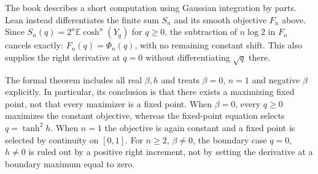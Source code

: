 \begin{remark}\label{rem:sg-tal:replica-fixed-point-comparison}
The book describes a short computation using Gaussian integration by parts.
Lean instead differentiates the finite sum $S_n$ and its smooth objective $F_n$ above.
Since $S_n(q)=2^n\mathbb E\cosh^n(Y_q)$ for $q\ge0$, the subtraction of $n\log2$
in $F_n$ cancels exactly: $F_n(q)=\Phi_n(q)$, with no remaining constant shift.
This also supplies the right derivative at $q=0$ without differentiating $\sqrt q$ there.

The formal theorem includes all real $\beta,h$ and treats $\beta=0$, $n=1$ and negative
$\beta$ explicitly. In particular, its conclusion is that there exists a maximizing
fixed point, not that every maximizer is a fixed point. When $\beta=0$, every $q\ge0$
maximizes the constant objective, whereas the fixed-point equation selects
$q=\tanh^2h$. When $n=1$ the objective is again constant and a fixed point is selected
by continuity on $[0,1]$. For $n\ge2$, $\beta\ne0$, the boundary case $q=0$, $h\ne0$
is ruled out by a positive right increment, not by setting the derivative at a boundary
maximum equal to zero.
\end{remark}

